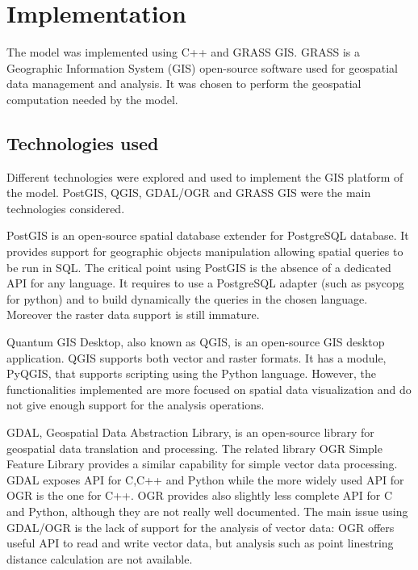 \documentclass[12pt,a4paper,twoside]{book}
\begin{document}
\chapter{Implementation}\label{implementation}
The model was implemented using C++ and GRASS GIS. GRASS is a Geographic Information System (GIS) open-source software used for geospatial data management and analysis. It was chosen to perform the geospatial computation needed by the model.

\section{Technologies used}
Different technologies were explored and used to implement the GIS platform of the model. PostGIS, QGIS, GDAL/OGR and GRASS GIS were the main technologies considered.

PostGIS is an open-source spatial database extender for PostgreSQL database. It provides support for geographic objects manipulation allowing spatial queries to be run in SQL. The critical point using PostGIS is the absence of a dedicated API for any language. It requires to use a PostgreSQL adapter (such as psycopg for python) and to build dynamically the queries in the chosen language. Moreover the raster data support is still immature.

Quantum GIS Desktop, also known as QGIS, is an open-source GIS desktop application. QGIS supports both vector and raster formats. It has a module, PyQGIS, that supports scripting using the Python language. However, the functionalities implemented are more focused on spatial data visualization and do not give enough support for the analysis operations.

GDAL, Geospatial Data Abstraction Library, is an open-source library for geospatial data translation and processing. The related library OGR Simple Feature Library provides a similar capability for simple vector data processing. GDAL exposes API for C,C++ and Python while the more widely used API for OGR is the one for C++. OGR provides also slightly less complete API for C and Python, although they are not really well documented. The main issue using GDAL/OGR is the lack of support for the analysis of vector data: OGR offers useful API to read and write vector data, but analysis such as point linestring distance calculation are not available.
\end{document}
